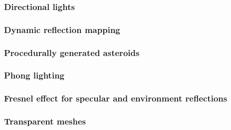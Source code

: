 \documentclass[11pt]{scrartcl} %
\begin{document}
        \subsubsection{Directional lights}
        \subsubsection{Dynamic reflection mapping}
        \subsubsection{Procedurally generated asteroids}
        \subsubsection{Phong lighting}
        \subsubsection{Fresnel effect for specular and environment reflections}
        \subsubsection{Transparent meshes}
\end{document}

